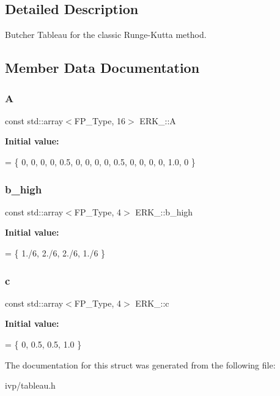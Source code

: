 \subsection{Detailed Description}
Butcher Tableau for the classic Runge-\/\+Kutta method. 

\subsection{Member Data Documentation}
\mbox{\label{structERK__04_a09c8913d7fa939adfdf8043561160a41}} 
\subsubsection{\texorpdfstring{A}{A}}
{\footnotesize\ttfamily const std\+::array$<$F\+P\+\_\+\+Type, 16$>$ E\+R\+K\+\_\+::A}

{\bfseries Initial value\+:}
\begin{DoxyCode}
= \{
    0,    0,    0,    0,
    0.5,  0,    0,    0,
    0,    0.5,  0,    0,
    0,    0,    1.0,  0
  \}
\end{DoxyCode}
\mbox{\label{structERK__04_a328bf104ac532f6c42164a9ef0d3b95c}} 
\subsubsection{\texorpdfstring{b\+\_\+high}{b\_high}}
{\footnotesize\ttfamily const std\+::array$<$F\+P\+\_\+\+Type, 4$>$ E\+R\+K\+\_\+::b\+\_\+high}

{\bfseries Initial value\+:}
\begin{DoxyCode}
= \{
    1./6, 2./6, 2./6, 1./6
  \}
\end{DoxyCode}
\mbox{\label{structERK__04_a99fc8b005471e7b1946051149af63ea8}} 
\subsubsection{\texorpdfstring{c}{c}}
{\footnotesize\ttfamily const std\+::array$<$F\+P\+\_\+\+Type, 4$>$ E\+R\+K\+\_\+::c}

{\bfseries Initial value\+:}
\begin{DoxyCode}
= \{
    0, 0.5, 0.5, 1.0
  \}
\end{DoxyCode}


The documentation for this struct was generated from the following file\+:\begin{DoxyCompactItemize}
\item 
ivp/tableau.\+h\end{DoxyCompactItemize}
